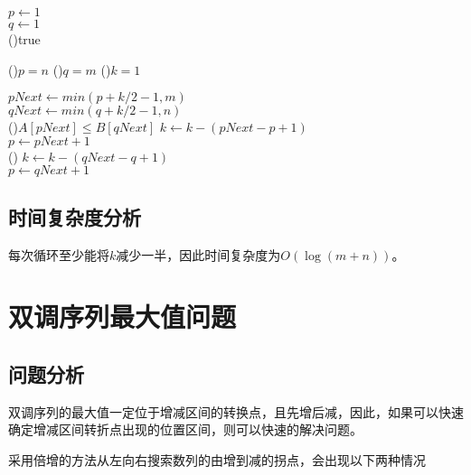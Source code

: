 \begin{algorithm}[H]
    \caption{$findKthMinElement(A[1..n], B[1..m],k)$}\label{algo:mid}
     $p \leftarrow 1$\\
     $q \leftarrow 1$\\
    \While(){true}{
        \If(){$p = n$}{
        }
        \If(){$q = m$}{
        }
        \If(){$k=1$}{
        }

        $pNext\leftarrow min(p+k/2-1,m)$\\
        $qNext\leftarrow min(q+k/2-1,n)$\\

        \If(){$A[pNext] \leq B[qNext]$}{
            $k \leftarrow k-(pNext - p + 1)$\\
            $p\leftarrow pNext + 1$\\
        }\Else(){
            $k \leftarrow k-(qNext - q + 1)$\\
            $p \leftarrow qNext + 1$\\
        }
    }
    
\end{algorithm}

\subsection*{时间复杂度分析}
每次循环至少能将$k$减少一半，因此时间复杂度为$O(\log (m+n))$。

\section{双调序列最大值问题}
\subsection*{问题分析}

双调序列的最大值一定位于增减区间的转换点，且先增后减，因此，如果可以快速确定增减区间转折点出现的位置区间，则可以快速的解决问题。

采用倍增的方法从左向右搜索数列的由增到减的拐点，会出现以下两种情况

